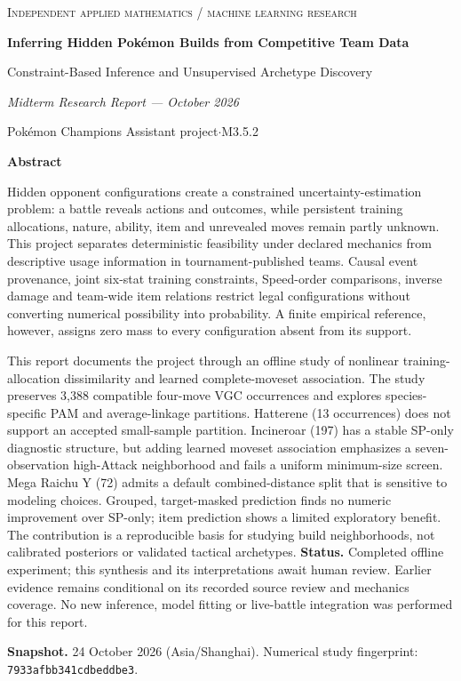 \documentclass[10pt,a4paper]{article}
\begin{document}
\begin{titlepage}
\vspace*{11mm}
{\large\color{accent}\textsc{Independent applied mathematics / machine learning research}}\par
\vspace{12mm}
{\Huge\bfseries\color{ink}Inferring Hidden Pok\'emon Builds from Competitive Team Data}\par
\vspace{6mm}
{\LARGE Constraint-Based Inference and Unsupervised Archetype Discovery}\par
\vspace{10mm}
{\Large\itshape Midterm Research Report --- October 2026}\par
\vspace{3mm}
Pok\'emon Champions Assistant project\quad$\cdot$\quad M3.5.2\par
\vspace{11mm}
\textbf{Abstract}\par
Hidden opponent configurations create a constrained uncertainty-estimation problem: a battle reveals actions and outcomes, while persistent training allocations, nature, ability, item and unrevealed moves remain partly unknown. This project separates deterministic feasibility under declared mechanics from descriptive usage information in tournament-published teams. Causal event provenance, joint six-stat training constraints, Speed-order comparisons, inverse damage and team-wide item relations restrict legal configurations without converting numerical possibility into probability. A finite empirical reference, however, assigns zero mass to every configuration absent from its support.

This report documents the project through an offline study of nonlinear training-allocation dissimilarity and learned complete-moveset association. The study preserves 3,388 compatible four-move VGC occurrences and explores species-specific PAM and average-linkage partitions. Hatterene (13 occurrences) does not support an accepted small-sample partition. Incineroar (197) has a stable SP-only diagnostic structure, but adding learned moveset association emphasizes a seven-observation high-Attack neighborhood and fails a uniform minimum-size screen. Mega Raichu Y (72) admits a default combined-distance split that is sensitive to modeling choices. Grouped, target-masked prediction finds no numeric improvement over SP-only; item prediction shows a limited exploratory benefit. The contribution is a reproducible basis for studying build neighborhoods, not calibrated posteriors or validated tactical archetypes.
\vfill
\small\textbf{Status.} Completed offline experiment; this synthesis and its interpretations await human review. Earlier evidence remains conditional on its recorded source review and mechanics coverage. No new inference, model fitting or live-battle integration was performed for this report.\par
\textbf{Snapshot.} 24 October 2026 (Asia/Shanghai). Numerical study fingerprint: \texttt{7933afbb341cdbeddbe3}.
\end{titlepage}
\end{document}
